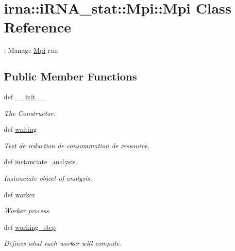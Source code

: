 \hypertarget{classirna_1_1iRNA__stat_1_1Mpi_1_1Mpi}{
\section{irna\-:\-:i\-R\-N\-A\-\_\-stat\-:\-:\-Mpi\-:\-:\-Mpi \-Class \-Reference}
\label{classirna_1_1iRNA__stat_1_1Mpi_1_1Mpi}
}


\-: \-Manage \hyperlink{classirna_1_1iRNA__stat_1_1Mpi_1_1Mpi}{\-Mpi} run  


\subsection*{\-Public \-Member \-Functions}
\begin{DoxyCompactItemize}
\item 
def \hyperlink{classirna_1_1iRNA__stat_1_1Mpi_1_1Mpi_ab860a157da1c06f31ad53390116fb4b9}{\-\_\-\-\_\-init\-\_\-\-\_\-}
\begin{DoxyCompactList}\small\item\em \-The \-Constructor. \end{DoxyCompactList}\item 
def \hyperlink{classirna_1_1iRNA__stat_1_1Mpi_1_1Mpi_a7167cb3629e407fdf6192cdacd2cc28f}{waiting}
\begin{DoxyCompactList}\small\item\em \-Test de reduction de consommation de ressource. \end{DoxyCompactList}\item 
def \hyperlink{classirna_1_1iRNA__stat_1_1Mpi_1_1Mpi_ad31f84677788a98e50aa7d45191b5fca}{instanciate\-\_\-analysis}
\begin{DoxyCompactList}\small\item\em \-Instanciate object of analysis. \end{DoxyCompactList}\item 
def \hyperlink{classirna_1_1iRNA__stat_1_1Mpi_1_1Mpi_a06812eaa71d2c5db0d24bd9f3af744bc}{worker}
\begin{DoxyCompactList}\small\item\em \-Worker process. \end{DoxyCompactList}\item 
def \hyperlink{classirna_1_1iRNA__stat_1_1Mpi_1_1Mpi_ae6069baba6ee77f605cbca14c972ee00}{working\-\_\-step}
\begin{DoxyCompactList}\small\item\em \-Defines what each worker will compute. \end{DoxyCompactList}\item 

\end{DoxyCompactItemize}

